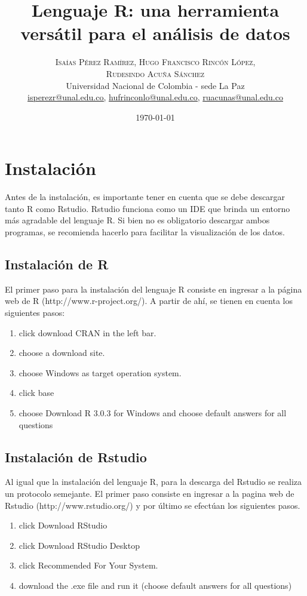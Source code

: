 \documentclass[twoside,twocolumn]{article}
\title{Lenguaje R: una herramienta versátil para el análisis de datos} %
\author{%
\textsc{Isaías Pérez Ramírez, Hugo Francisco Rincón López,} \\[1ex] %
\textsc{Rudesindo Acuña Sánchez} \\[1ex] %
\normalsize Universidad Nacional de Colombia - sede La Paz \\ %
\normalsize \href{mailto:isperezr@unal.edu.co}{isperezr@unal.edu.co,}
\normalsize \href{mailto:hufrinconlo@unal.edu.co}{hufrinconlo@unal.edu.co,}
\normalsize \href{mailto:ruacunas@unal.edu.co}{ruacunas@unal.edu.co}%
}
\date{\today} %
\begin{document}
\maketitle


\section{Instalación}

Antes de la instalación, es importante tener en cuenta que se debe descargar tanto R como Rstudio. Rstudio funciona como un IDE que brinda un entorno más agradable del lenguaje R. Si bien no es obligatorio descargar ambos programas, se recomienda hacerlo para facilitar la visualización de los datos.

\subsection{Instalación de R}
El primer paso para la instalación del lenguaje R consiste en ingresar a la página web de R (http://www.r-project.org/). A partir de ahí, se tienen en cuenta los siguientes pasos:
\begin{enumerate}
    \item click download CRAN in the left bar.
    \item choose a download site.
    \item choose Windows as target operation system.
    \item click base
    \item choose Download R 3.0.3 for Windows and
choose default answers for all questions
\end{enumerate}


\subsection{Instalación de Rstudio}
Al igual que la instalación del lenguaje R, para la descarga del Rstudio se realiza un protocolo semejante. El primer paso consiste en ingresar a la pagina web de Rstudio (http://www.rstudio.org/) y por último se efectúan los siguientes pasos. 
\begin{enumerate}
    \item click Download RStudio
    \item click Download RStudio Desktop
    \item click Recommended For Your System.
    \item  download the .exe file and run it (choose default
answers for all questions)
\end{enumerate}
\end{document}
